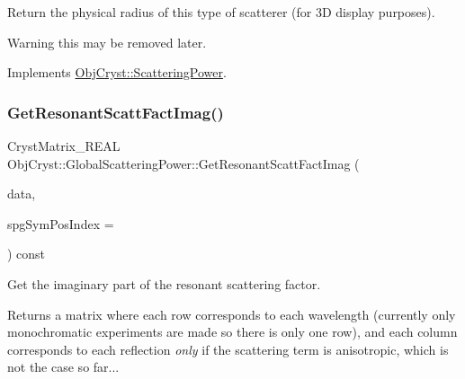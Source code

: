 Return the physical radius of this type of scatterer (for 3D display purposes). \begin{DoxyWarning}{Warning}
this may be removed later. 
\end{DoxyWarning}


Implements \mbox{\hyperlink{class_obj_cryst_1_1_scattering_power_ac44860aca21734844379ddec87622f7b}{Obj\+Cryst\+::\+Scattering\+Power}}.

\mbox{\label{class_obj_cryst_1_1_global_scattering_power_af570597de2c717e60b63507745e32e32}} 
\subsubsection{\texorpdfstring{GetResonantScattFactImag()}{GetResonantScattFactImag()}}
{\footnotesize\ttfamily Cryst\+Matrix\+\_\+\+R\+E\+AL Obj\+Cryst\+::\+Global\+Scattering\+Power\+::\+Get\+Resonant\+Scatt\+Fact\+Imag (\begin{DoxyParamCaption}\item[{const \mbox{\hyperlink{class_obj_cryst_1_1_scattering_data}{Scattering\+Data}} \&}]{data,  }\item[{const int}]{spg\+Sym\+Pos\+Index = {} }\end{DoxyParamCaption}) const\hspace{0.3cm}{\ttfamily [virtual]}}



Get the imaginary part of the resonant scattering factor. 

\begin{DoxyReturn}{Returns}
a matrix where each row corresponds to each wavelength (currently only monochromatic experiments are made so there is only one row), and each column corresponds to each reflection {\itshape only} if the scattering term is anisotropic, which is not the case so far... 
\end{DoxyReturn}

